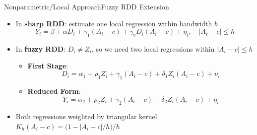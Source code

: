 \documentclass[hyperref={pdfpagelabels=false}]{beamer}
\begin{document}
\begin{frame}{Nonparametric/Local Approach}{Fuzzy RDD Extension}
	\begin{itemize}
		\item In \textbf{sharp RDD}: estimate one local regression within bandwidth $h$
		\begin{equation*}
			Y_i = \beta + \alpha D_i + \gamma_1(A_i - c) + \gamma_2 D_i(A_i-c) + \eta_i, \quad |A_i-c|\leq h
		\end{equation*}
		\vspace{0.1cm}
		\item In \textbf{fuzzy RDD}: $D_i \ne Z_i$, so we need two local regressions within $|A_i - c|\leq h$
		\vspace{0.2cm}
		\begin{itemize}
			\item \textbf{First Stage}:
			\begin{equation*}
				D_i = \alpha_1 + \rho_1 Z_i + \gamma_1(A_i-c) + \delta_1 Z_i(A_i-c) + \upsilon_i
			\end{equation*}
			\vspace{0.1cm}
			\item \textbf{Reduced Form}:
			\begin{equation*}
				Y_i = \alpha_2 + \rho_2 Z_i + \gamma_2(A_i-c) + \delta_2 Z_i(A_i-c) + \eta_i
			\end{equation*}
		\end{itemize}
		\vspace{0.1cm}
		\item Both regressions weighted by triangular kernel $K_h(A_i - c) = \bigl(1 - |A_i-c|/h\bigr)/h$
	\end{itemize}
\end{frame}
\end{document}
